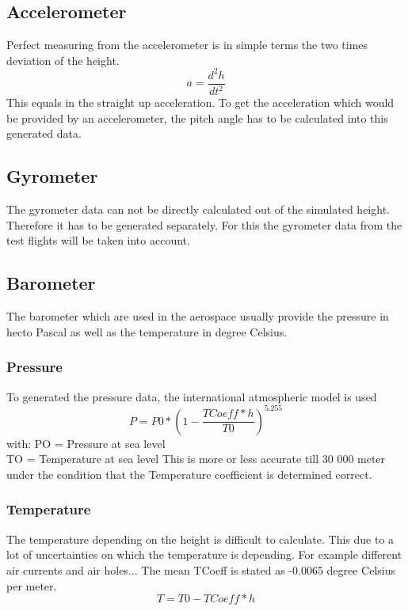   \subsection{Accelerometer}
  Perfect measuring from the accelerometer is in simple terms the two times deviation of the height.
  $$a = \frac{d^2h}{dt^2}$$
  This equals in the straight up acceleration. To get the acceleration which would be provided by an accelerometer,
  the pitch angle has to be calculated into this generated data.
  
  \subsection{Gyrometer}
  The gyrometer data can not be directly calculated out of the simulated height.
  Therefore it has to be generated separately.
  For this the gyrometer data from the test flights will be taken into account.
  
  \subsection{Barometer}
  The barometer which are used in the aerospace usually provide the pressure in hecto Pascal as well as the temperature in degree Celsius.
  \subsubsection{Pressure}
  To generated the pressure data, the international atmospheric model is used %
  $$P = P0 * (1- \frac{TCoeff*h}{T0})^{5.255}$$
  with: PO = Pressure at sea level \\
	TO = Temperature at sea level
  This is more or less accurate till 30 000 meter under the condition that the Temperature coefficient is determined correct. 

  \subsubsection{Temperature}
  The temperature depending on the height is difficult to calculate.
  This due to a lot of uncertainties on which the temperature is depending.
  For example different air currents and air holes...
  The mean TCoeff is stated as -0.0065 degree Celsius per meter.
  $$T = T0 - TCoeff*h$$
  
